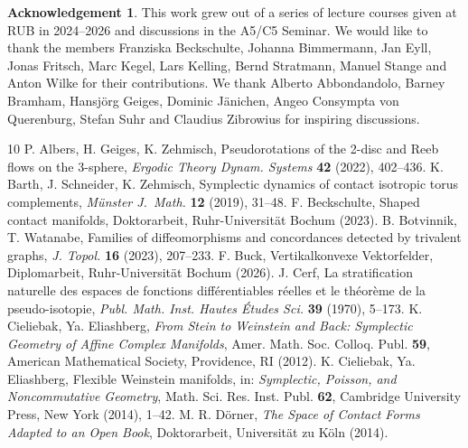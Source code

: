 \documentclass{amsart}
\theoremstyle{definition}
\newtheorem*{ack}{Acknowledgement}
\begin{document}
\begin{ack}
  This work grew out of a series of lecture courses
  given at RUB in 2024--2026 and
  discussions in the A5/C5 Seminar.
  We would like to thank the members
  Franziska Beckschulte,
  Johanna Bimmermann,
  Jan Eyll,
  Jonas Fritsch,
  Marc Kegel,
  Lars Kelling,
  Bernd Stratmann,
  Manuel Stange
  and Anton Wilke
  for their contributions.
  We thank Alberto Abbondandolo,
  Barney Bramham,
  Hansjörg Geiges,
  Dominic Jänichen,
  Angeo Consympta von Querenburg,
  Stefan Suhr and
  Claudius Zibrowius
  for inspiring discussions.
\end{ack}




\begin{thebibliography}{10}
%  
  {\sc P. Albers, H. Geiges, K. Zehmisch},
  Pseudorotations of the 2-disc and {R}eeb flows on the 3-sphere,
  \textit{Ergodic Theory Dynam. Systems} {\bf 42} (2022),
  402--436.
%
  {\sc K. Barth, J. Schneider, K. Zehmisch},
  Symplectic dynamics of contact isotropic torus complements,
  \textit{M\"unster J.\ Math.} {\bf 12} (2019),
  31--48.
%
  {\sc F. Beckschulte},
  Shaped contact manifolds,
  Doktorarbeit, Ruhr-Universit\"at Bochum (2023).
%
  {\sc B. Botvinnik, T. Watanabe},
  Families of diffeomorphisms and concordances
  detected by trivalent graphs,
  \textit{J. Topol.} {\bf 16} (2023),
  207--233.
%
  {\sc F. Buck},
  Vertikalkonvexe Vektorfelder,
  Diplomarbeit, Ruhr-Universit\"at Bochum (2026).
%
  {\sc J. Cerf},
  La stratification naturelle des espaces de fonctions
             diff{\'e}rentiables r{\'e}elles et le th{\'e}or{\`e}me
             de la pseudo-isotopie,
  \textit{Publ. Math. Inst. Hautes {\'E}tudes Sci.} {\bf 39} (1970),
  5--173.
%  
  {\sc K. Cieliebak, Ya. Eliashberg},
  \textit{From Stein to Weinstein and Back:
  Symplectic Geometry of Affine Complex Manifolds},
  Amer. Math. Soc. Colloq. Publ. {\bf 59},
  American Mathematical Society, Providence, RI (2012).
%
  {\sc K. Cieliebak, Ya. Eliashberg},
  Flexible {W}einstein manifolds,
  in: \textit{Symplectic, Poisson, and Noncommutative Geometry},
  Math. Sci. Res. Inst. Publ. {\bf 62},
  Cambridge University Press, New York (2014),
  1--42.
%
  {\sc M. R. D\"orner},
  \textit{The Space of Contact Forms Adapted to an Open Book},
  Doktorarbeit, Universit\"at zu K\"oln (2014).
%

\end{thebibliography}
\end{document}
